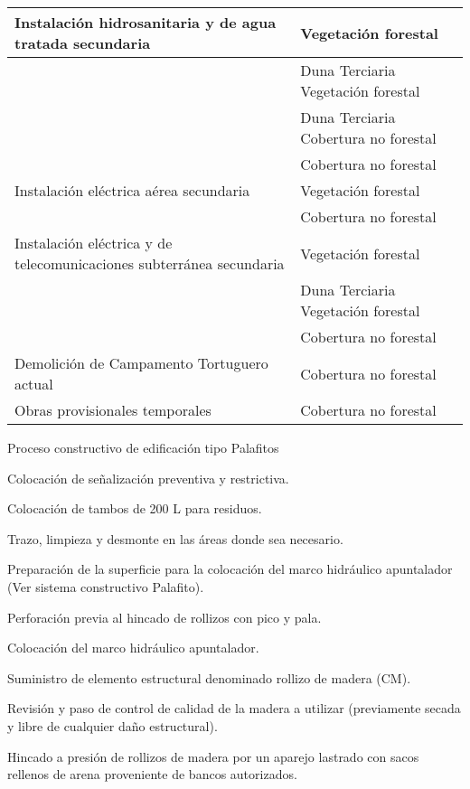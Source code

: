 \documentclass{article}
\begin{document}
\begin{multicols}{2}
\begin{flushleft}
\begin{tabular}{m{2.7949998cm}m{0.26cm}|m{3.899cm}|}
\multicolumn{2}{|m{3.2549999cm}|}{Instalación hidrosanitaria y de agua tratada secundaria} &
Vegetación forestal \\\hline
 &
 &
Duna Terciaria Vegetación forestal\\\hhline{~~-}
 &
 &
Duna Terciaria Cobertura no forestal\\\hhline{~~-}
 &
 &
Cobertura no forestal\\\hline
\multicolumn{2}{|m{3.2549999cm}|}{Instalación eléctrica aérea secundaria} &
Vegetación forestal\\\hline
 &
 &
Cobertura no forestal \\\hline
\multicolumn{2}{|m{3.2549999cm}|}{Instalación eléctrica y de telecomunicaciones subterránea secundaria} &
Vegetación forestal \\\hline
 &
 &
Duna Terciaria Vegetación forestal\\\hhline{~~-}
 &
 &
Cobertura no forestal \\\hline
\multicolumn{2}{|m{3.2549999cm}|}{Demolición de Campamento Tortuguero actual} &
Cobertura no forestal \\\hline
\multicolumn{2}{|m{3.2549999cm}|}{Obras provisionales temporales~} &
Cobertura no forestal \\\hline
\end{tabular}
\end{flushleft}

\bigskip
\end{multicols}
Proceso constructivo de edificación tipo Palafitos 


\bigskip

Colocación de señalización preventiva y restrictiva.

Colocación de tambos de 200 L para residuos.

Trazo, limpieza y desmonte en las áreas donde sea necesario.

Preparación de la superficie para la colocación del marco hidráulico apuntalador (Ver sistema constructivo Palafito).

Perforación previa al hincado de rollizos con pico y pala.

Colocación del marco hidráulico apuntalador. 

Suministro de elemento estructural denominado rollizo de madera (CM).

Revisión y paso de control de calidad de la madera a utilizar (previamente secada y libre de cualquier daño estructural).

Hincado a presión de rollizos de madera por un aparejo lastrado con sacos rellenos de arena proveniente de bancos autorizados. 
\end{document}
